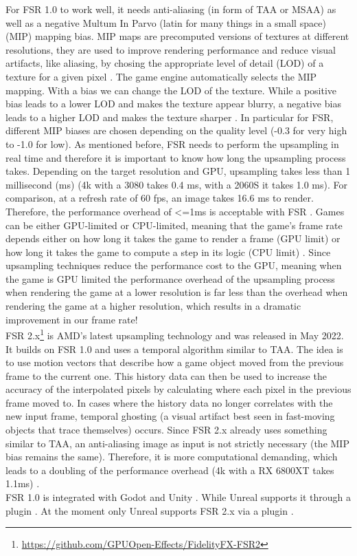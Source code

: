\documentclass[letterpaper, 10 pt, conference]{ieeeconf}  %
\begin{document}
For FSR 1.0 to work well, it needs anti-aliasing (in form of TAA or MSAA) as well as a negative Multum In Parvo (latin for many things in a small space) (MIP) mapping bias.
MIP maps are precomputed versions of textures at different resolutions, they are used to improve rendering performance and reduce visual artifacts, like aliasing, by chosing the appropriate level of detail (LOD) of a texture for a given pixel \cite{MIP_map}.
The game engine automatically selects the MIP mapping. With a bias we can change the LOD of the texture. While a positive bias leads to a lower LOD and makes the texture appear blurry, a negative bias leads to a higher LOD and makes the texture sharper \cite{MIP_mapBias}.
In particular for FSR, different MIP biases are chosen depending on the quality level (-0.3 for very high to -1.0 for low).
As mentioned before, FSR needs to perform the upsampling in real time and therefore it is important to know how long the upsampling process takes.
Depending on the target resolution and GPU, upsampling takes less than 1 millisecond (ms) (4k with a 3080 takes 0.4 ms, with a 2060S it takes 1.0 ms).
For comparison, at a refresh rate of 60 fps, an image takes 16.6 ms to render. Therefore, the performance overhead of <=1ms is acceptable with FSR \cite{fsr1.0}.
Games can be either GPU-limited or CPU-limited, meaning that the game's frame rate depends either on how long it takes the game to render a frame (GPU limit) or how long it takes the game to compute a step in its logic (CPU limit) \cite{gpu-cpu-limit}.
Since upsampling techniques reduce the performance cost to the GPU, meaning when the game is GPU limited the performance overhead of the upsampling process when rendering the game at a lower resolution is far less than the overhead when rendering the game at a higher resolution, which results in a dramatic improvement in our frame rate!\\
FSR 2.x\footnote{\url{https://github.com/GPUOpen-Effects/FidelityFX-FSR2}} is AMD's latest upsampling technology and was released in May 2022.
It builds on FSR 1.0 and uses a temporal algorithm similar to TAA. The idea is to use motion vectors that describe how a game object moved from the previous frame to the current one.
This history data can then be used to increase the accuracy of the interpolated pixels by calculating where each pixel in the previous frame moved to.
In cases where the history data no longer correlates with the new input frame, temporal ghosting (a visual artifact best seen in fast-moving objects that trace themselves) occurs. 
Since FSR 2.x already uses something similar to TAA, an anti-aliasing image as input is not strictly necessary (the MIP bias remains the same).
Therefore, it is more computational demanding, which leads to a doubling of the performance overhead (4k with a RX 6800XT takes 1.1ms) \cite{fsr2.x}.\\
FSR 1.0 is integrated with Godot \cite{fsr1_godot} and Unity \cite{fsr1_unity}. While Unreal supports it through a plugin \cite{fsr1_unreal}.
At the moment only Unreal supports FSR 2.x via a plugin \cite{fsr2.x_unreal}.
\end{document}
